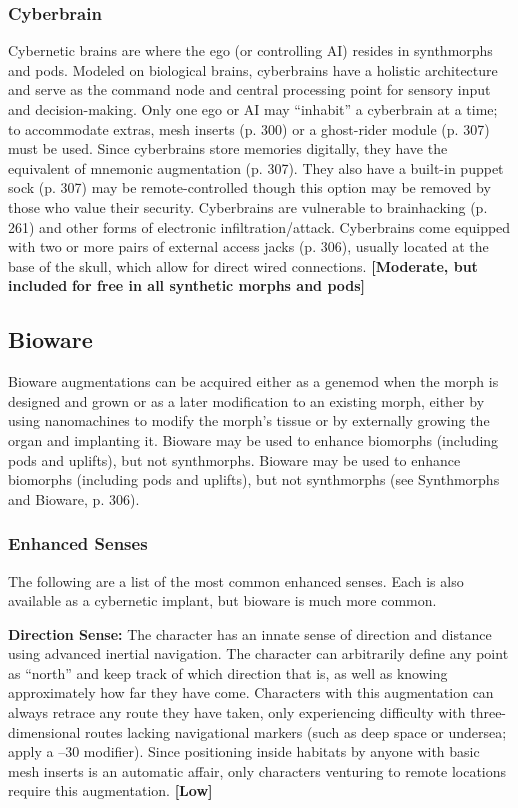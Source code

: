 \subsubsection{Cyberbrain}

Cybernetic brains are where the ego (or controlling 
AI) resides in synthmorphs and pods. Modeled on biological
brains, cyberbrains have a holistic architecture
and serve as the command node and central processing
point for sensory input and decision-making. Only
one ego or AI may ``inhabit'' a cyberbrain at a time; to 
accommodate extras, mesh inserts (p. 300) or a ghost-rider
module (p. 307) must be used. Since cyberbrains
store memories digitally, they have the equivalent of 
mnemonic augmentation (p. 307). They also have 
a built-in puppet sock (p. 307) may be remote-controlled
though this option may be removed by those
who value their security. Cyberbrains are vulnerable 
to brainhacking (p. 261) and other forms of electronic 
infiltration/attack. Cyberbrains come equipped with 
two or more pairs of external access jacks (p. 306), 
usually located at the base of the skull, which allow 
for direct wired connections. \textbf{[Moderate, but included }
\textbf{for free in all synthetic morphs and pods]}

\subsection{Bioware}

Bioware augmentations can be acquired either as a genemod
when the morph is designed and grown or as a
later modification to an existing morph, either by using 
nanomachines to modify the morph's tissue or by externally
growing the organ and implanting it. Bioware
may be used to enhance biomorphs (including pods and 
uplifts), but not synthmorphs. Bioware may be used to 
enhance biomorphs (including pods and uplifts), but not 
synthmorphs (see Synthmorphs and Bioware, p. 306).

\subsubsection{Enhanced Senses}

The following are a list of the most common enhanced 
senses. Each is also available as a cybernetic implant, 
but bioware is much more common.

\textbf{Direction Sense:} The character has an innate sense 
of direction and distance using advanced inertial 
navigation. The character can arbitrarily define any 
point as ``north'' and keep track of which direction 
that is, as well as knowing approximately how far 
they have come. Characters with this augmentation 
can always retrace any route they have taken, only 
experiencing difficulty with three-dimensional routes 
lacking navigational markers (such as deep space or 
undersea; apply a –30 modifier). Since positioning 
inside habitats by anyone with basic mesh inserts is an 
automatic affair, only characters venturing to remote 
locations require this augmentation. \textbf{[Low]}

